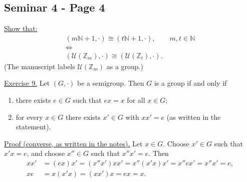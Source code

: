 
\subsection*{Seminar 4 - Page 4}

\noindent\underline{Show that:}
\[
\begin{gathered}
 (m\mathbb N+1,\cdot)\cong(t\mathbb N+1,\cdot),
 \qquad m,t\in\mathbb N \\[2pt]
 \Longleftrightarrow\\[-2pt]
 (\mathcal U(\mathbb Z_m),\cdot)
   \cong (\mathcal U(\mathbb Z_t),\cdot).
\end{gathered}
\]
\noindent (The manuscript labels $\mathcal U(\mathbb Z_m)$ as a group.)

\medskip
\noindent\underline{Exercise 9.}
Let $(G,\cdot)$ be a semigroup. Then $G$ is a group if and only if
\begin{enumerate}
 \item there exists $e\in G$ such that
       $ex=x$ for all $x\in G$;
 \item for every $x\in G$ there exists $x'\in G$ with
       $xx'=e$ (as written in the statement).
\end{enumerate}

\noindent\underline{Proof (converse, as written in the notes).}
Let $x\in G$. Choose $x'\in G$ such that $x'x=e$, and
choose $x''\in G$ such that $x''x'=e$. Then
\[
\begin{aligned}
 xx'&=(ex)x'=(x''x')xx'
       =x''(x'x)x'=x''ex'=x''x'=e,\\
 xe&=x(x'x)=(xx')x=ex=x.
\end{aligned}
\]

